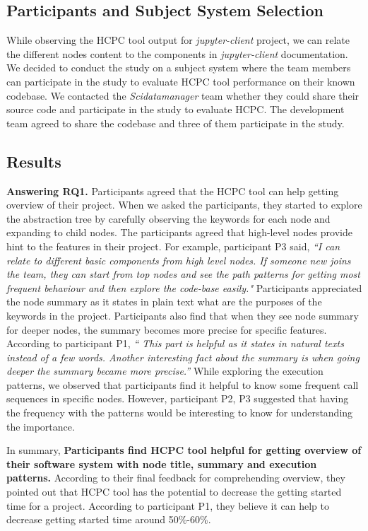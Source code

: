 \subsection{Participants and Subject System Selection}
While observing the HCPC tool output for \emph{jupyter-client} project, we can relate the different nodes content to the components in \emph{jupyter-client} documentation. We decided to conduct the study on a subject system where the team members can participate in the study to evaluate HCPC tool performance on their known codebase. We contacted the \emph{Scidatamanager} team whether they could share their source code and participate in the study to evaluate HCPC. The development team agreed to share the codebase and three of them participate in the study. 
\subsection{Results}
\textbf{Answering RQ1.} Participants agreed that the HCPC tool can help getting overview of their project. When we asked the participants, they started to explore the abstraction tree by carefully observing the keywords for each node and expanding to child nodes. The participants agreed that high-level nodes provide hint to the features in their project. For example, participant P3 said, \emph{``I can relate to different basic components from high level nodes. If someone new joins the team, they can start from top nodes and see the path patterns for getting most frequent behaviour and then explore the code-base easily."} Participants appreciated the node summary as it states in plain text what are the purposes of the keywords in the project. Participants also find that when they see node summary for deeper nodes, the summary becomes more precise for specific features. 
According to participant P1, \emph{`` This part is helpful as it states in natural texts instead of a few words. Another interesting fact about the summary is when going deeper the summary became more precise.''} While exploring the execution patterns, we observed that participants find it helpful to know some frequent call sequences in specific nodes. However, participant P2, P3 suggested that having the frequency with the patterns would be interesting to know for understanding the importance. 

In summary, \textbf{Participants find HCPC tool helpful for getting overview of their software system with node title, summary and execution patterns.} According to their final feedback for comprehending overview, they pointed out that HCPC tool has the potential to decrease the getting started time for a project. According to participant P1, they believe  it can help to decrease getting started time around 50\%-60\%.

